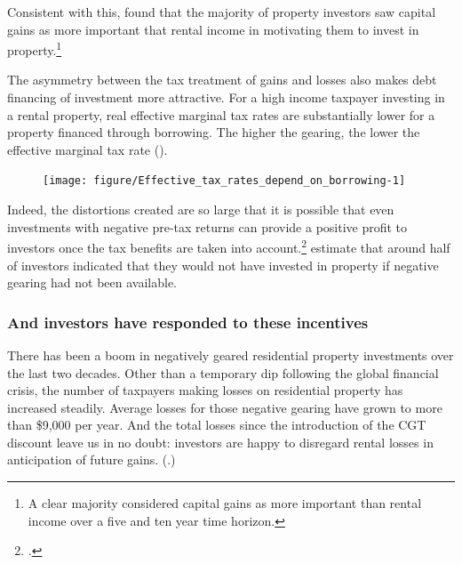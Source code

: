 \documentclass{grattan}\usepackage[]{graphicx}\usepackage[]{color}
\begin{document}
Consistent with this, \textcite{seelig2009understanding} found that the majority of property investors saw capital gains as more important that rental income in motivating them to invest in property.\footnote{A clear majority considered capital gains as more important than rental income over a five and ten year time horizon.}

The asymmetry between the tax treatment of gains and losses also makes debt financing of investment more attractive. For a high income taxpayer investing in a rental property, real effective marginal tax rates are substantially lower for a property financed through borrowing. The higher the gearing, the lower the effective marginal tax rate (). 


\begin{figure}[t]
\texttt{[image: figure/Effective\_tax\_rates\_depend\_on\_borrowing-1]}

\end{figure}
Indeed, the distortions created are so large that it is possible that even investments with negative pre-tax returns can provide a positive profit to investors once the tax benefits are taken into account.\footcite[p.~78]{Burman1999}  \textcite{seelig2009understanding} estimate that around half of investors indicated that they would not have invested in property if negative gearing had not been available.

\subsubsection{And investors have responded to these incentives}
There has been a boom in negatively geared residential property investments over the last two decades. Other than a temporary dip following the global financial crisis, the number of taxpayers making losses on residential property has increased steadily. Average losses for those negative gearing have grown to more than \$9,000 per year. And the total losses since the introduction of the CGT discount leave us in no doubt: investors are happy to disregard rental losses in anticipation of future gains. (.)
\end{document}
